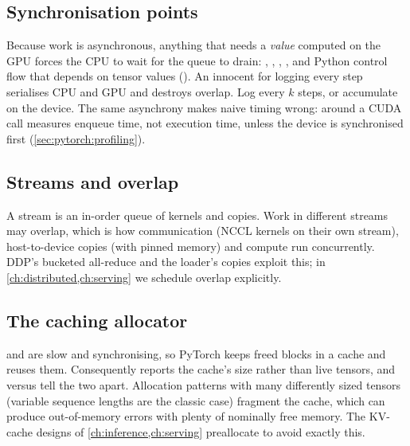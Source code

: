 \subsection{Synchronisation points}
Because work is asynchronous, anything that needs a \emph{value} computed on the GPU forces the CPU to wait
for the queue to drain: , , , , and Python control flow
that depends on tensor values (). An innocent  for logging every step
serialises CPU and GPU and destroys overlap. Log every $k$ steps, or accumulate on the device. The same
asynchrony makes naive timing wrong:  around a CUDA call measures enqueue time, not
execution time, unless the device is synchronised first (\cref{sec:pytorch:profiling}).

\subsection{Streams and overlap}
A stream is an in-order queue of kernels and copies. Work in different streams may overlap, which is how
communication (NCCL kernels on their own stream), host-to-device copies (with pinned memory) and compute run
concurrently. DDP's bucketed all-reduce and the loader's  copies exploit this; in
\cref{ch:distributed,ch:serving} we schedule overlap explicitly.

\subsection{The caching allocator}
 and  are slow and synchronising, so PyTorch keeps freed blocks in a cache and
reuses them. Consequently  reports the cache's size rather than live tensors, and
 versus  tell the two apart. Allocation
patterns with many differently sized tensors (variable sequence lengths are the classic case) fragment the
cache, which can produce out-of-memory errors with plenty of nominally free memory. The KV-cache designs of
\cref{ch:inference,ch:serving} preallocate to avoid exactly this.

